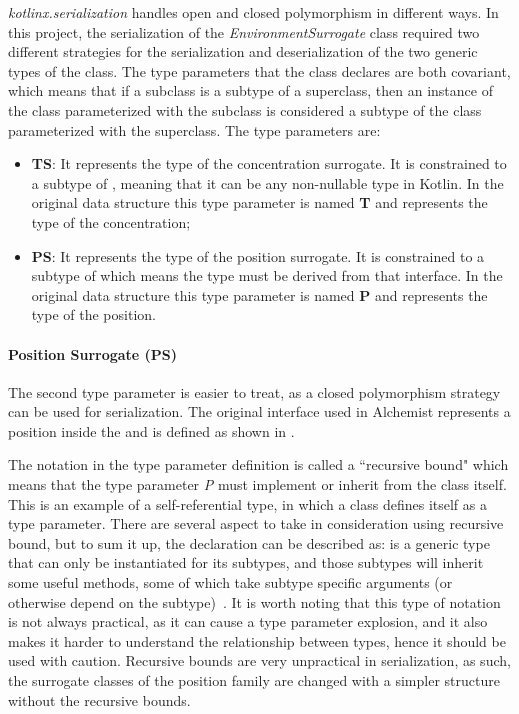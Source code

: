 \textit{kotlinx.serialization} handles open and closed polymorphism in different ways. In this project, the serialization of the \textit{EnvironmentSurrogate} class required two different strategies for the serialization and deserialization of the two generic types of the class. The type parameters that the class declares are both covariant, which means that if a subclass is a subtype of a superclass, then an instance of the class parameterized with the subclass is considered a subtype of the class parameterized with the superclass. The type parameters are:
\begin{itemize}
	\item \textbf{TS}: It represents the type of the concentration surrogate. It is constrained to a subtype of , meaning that it can be any non-nullable type in Kotlin. In the original  data structure this type parameter is named \textbf{T} and represents the type of the concentration;
	\item \textbf{PS}: It represents the type of the position surrogate. It is constrained to a subtype of  which means the type must be derived from that interface. In the original  data structure this type parameter is named \textbf{P} and represents the type of the position.
\end{itemize}

\paragraph{Position Surrogate (PS)} The second type parameter is easier to treat, as a closed polymorphism strategy can be used for serialization. The original  interface used in Alchemist represents a position inside the  and is defined as shown in .

\begin{info}
	The notation
	 in the type parameter definition is called a ``recursive bound" which means that the type parameter \textit{P} must implement or inherit from the class  itself. This is an example of a self-referential type, in which a class defines itself as a type parameter.
	There are several aspect to take in consideration using recursive bound, but to sum it up, the declaration  can be described as:  is a generic type that can only be instantiated for its subtypes, and those subtypes will inherit some useful methods, some of which take subtype specific arguments (or otherwise depend on the subtype)~\cite{Angelika45:online}. It is worth noting that this type of notation is not always practical, as it can cause a type parameter explosion, and it also makes it harder to understand the relationship between types, hence it should be used with caution. Recursive bounds are very unpractical in serialization, as such, the surrogate classes of the position family are changed with a simpler structure without the recursive bounds.
\end{info}

